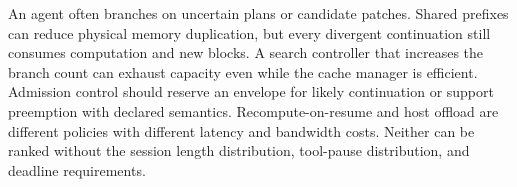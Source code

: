 An agent often branches on uncertain plans or candidate patches. Shared prefixes can reduce physical memory duplication, but every divergent continuation still consumes computation and new blocks. A search controller that increases the branch count can exhaust capacity even while the cache manager is efficient. Admission control should reserve an envelope for likely continuation or support preemption with declared semantics. Recompute-on-resume and host offload are different policies with different latency and bandwidth costs. Neither can be ranked without the session length distribution, tool-pause distribution, and deadline requirements.

